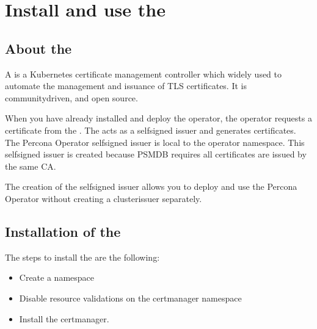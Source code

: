 \documentclass[letterpaper,10pt,english]{sphinxmanual}
\begin{document}
\section{Install and use the }
\label{\detokenize{TLS:install-and-use-the-cert-manager}}

\subsection{About the }
\label{\detokenize{TLS:about-the-cert-manager}}
A  is a Kubernetes certificate management controller which widely used to automate the management and issuance of TLS certificates. It is community\sphinxhyphen{}driven, and open source.

When you have already installed  and deploy the operator, the operator requests a certificate from the . The  acts as a self\sphinxhyphen{}signed issuer and generates certificates. The Percona Operator self\sphinxhyphen{}signed issuer is local to the operator namespace. This self\sphinxhyphen{}signed issuer is created because PSMDB requires all certificates are issued by the same CA.

The creation of the self\sphinxhyphen{}signed issuer allows you to deploy and use the Percona Operator without creating a clusterissuer separately.


\subsection{Installation of the }
\label{\detokenize{TLS:installation-of-the-cert-manager}}
The steps to install the  are the following:
\begin{itemize}
\item {} 
Create a namespace

\item {} 
Disable resource validations on the cert\sphinxhyphen{}manager namespace

\item {} 
Install the cert\sphinxhyphen{}manager.

\end{itemize}
\end{document}
